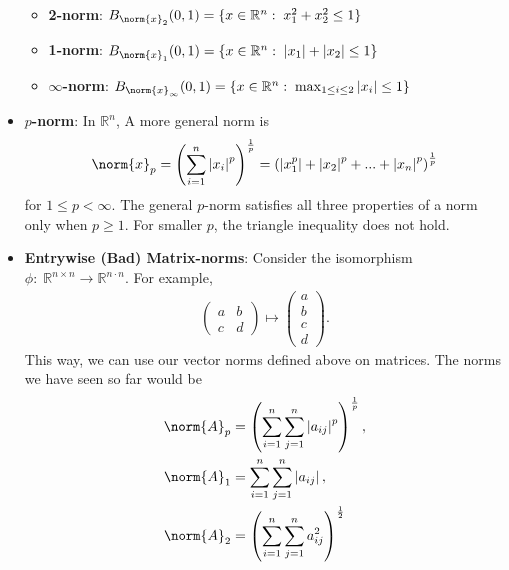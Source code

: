 \documentclass{report}
\begin{document}
\begin{itemize}
\begin{itemize}
                \item \textbf{2-norm}: $B_{\norm{x}_{2}}(0,1) = \{x\in \mathbb{R}^{n}:\; x_{1}^{2} + x_{2}^{2} \leq 1\}$
                \item \textbf{1-norm}: $B_{\norm{x}_{1}}(0,1) = \{x\in \mathbb{R}^{n}:\; \left\lvert x_{1} \right\rvert + \left\lvert x_{2} \right\rvert \leq 1\}$
                \item \textbf{$\infty$-norm}: $B_{\norm{x}_{\infty}}(0,1) = \{x\in \mathbb{R}^{n}:\; \max_{1 \leq i \leq 2}\left\lvert x_{i} \right\rvert \leq 1\}$
            \end{itemize}
        \item \textbf{$p$-norm}: In $\mathbb{R}^{n}$, A more general norm is
            \begin{align*}
                \norm{x}_{p} = \left(\sum_{i=1}^{n} \left\lvert x_{i} \right\rvert^{p}\right)^{\frac{1}{p}} = \left(\left\lvert x_{1}^{p} \right\rvert + \left\lvert x_{2} \right\rvert^{p} + ... + \left\lvert x_{n} \right\rvert^{p}\right)^{\frac{1}{p}}
            \end{align*}
            for $1 \leq p < \infty $. The general $p$-norm satisfies all three properties of a norm only when $p \geq 1$. For smaller $p$, the triangle inequality does not hold.
        \item \textbf{Entrywise (Bad) Matrix-norms}: Consider the isomorphism $\phi:\; \mathbb{R}^{n\times n} \to \mathbb{R}^{n\cdot n} $. For example, 
            \begin{align*}
                \begin{pmatrix} a & b \\ c & d \end{pmatrix} \mapsto \begin{pmatrix} a \\ b \\c \\d \end{pmatrix}
            .\end{align*}
            This way, we can use our vector norms defined above on matrices. The norms we have seen so far would be
            \begin{align*}
                \norm{A}_{p} &= \left(\sum_{i=1}^{n}\sum_{j=1}^{n}\left\lvert a_{ij} \right\rvert^{p}\right)^{\frac{1}{p}}, \\
                \norm{A}_{1} &= \sum_{i=1}^{n}\sum_{j=1}^{n} \left\lvert a_{ij} \right\rvert, \\
                \norm{A}_{2} &= \left(\sum_{i=1}^{n}\sum_{j=1}^{n}a_{ij}^{2}\right)^{\frac{1}{2}}

\end{align*}
\end{itemize}
\end{document}
